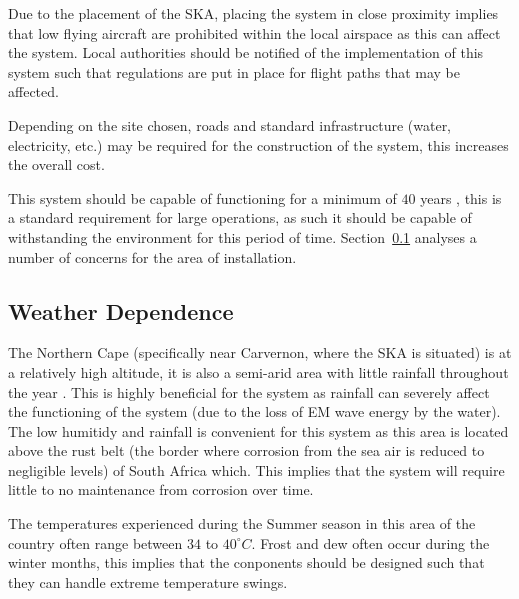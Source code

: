 \documentclass[11pt]{witseiepaper}
\begin{document}
Due to the placement of the SKA, placing the system in close proximity implies that low flying aircraft are prohibited within the local airspace as this can affect the system.
Local authorities should be notified of the implementation of this system such that regulations are put in place for flight paths that may be affected.

Depending on the site chosen, roads and standard infrastructure (water, electricity, etc.) may be required for the construction of the system, this increases the overall cost.

This system should be capable of functioning for a minimum of $40$ years \cite[p.~336]{AMISRCosting}, this is a standard requirement for large operations, as such it should be capable of withstanding the environment for this period of time. Section~\ref{sec:WeatherDependence} analyses a number of concerns for the area of installation.

\subsection{Weather Dependence} \label{sec:WeatherDependence}
The Northern Cape (specifically near Carvernon, where the SKA is situated) is at a relatively high altitude, it is also a semi-arid area with little rainfall throughout the year \cite{Rainfall}.
This is highly beneficial for the system as rainfall can severely affect the functioning of the system (due to the loss of EM wave energy by the water).
The low humitidy and rainfall is convenient for this system as this area is located above the rust belt (the border where corrosion from the sea air is reduced to negligible levels) of South Africa which. This implies that the system will require little to no maintenance from corrosion over time.

The temperatures experienced during the Summer season in this area of the country often range between $34$ to $40^{\circ} C$. Frost and dew often occur during the winter months, this implies that the conponents should be designed such that they can handle extreme temperature swings.





\end{document}
